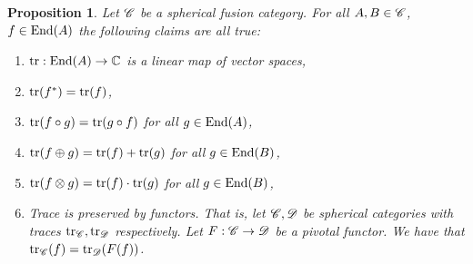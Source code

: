 \documentclass{article}
\newtheorem{proposition}{Proposition}[section]
\theoremstyle{definition}
\numberwithin{figure}{section}
\begin{document}
\begin{proposition}\label{trace} Let $\mathscr{C}$ be a spherical fusion category. For all $A,B\in \mathscr{C}$, $f\in \mathrm{End}(A)$ the following claims are all true:

\begin{enumerate}
\item $\mathrm{tr}: \mathrm{End}(A)\to \mathbb{C}$ is a linear map of vector spaces,
\item $\mathrm{tr}(f^{*})=\mathrm{tr}(f)$,
\item $\mathrm{tr}(f\circ g)=\mathrm{tr}(g\circ f)$ for all $g\in \mathrm{End}(A)$,
\item $\mathrm{tr}(f\oplus g)=\mathrm{tr}(f)+\mathrm{tr}(g)$ for all $g\in \mathrm{End}(B)$,
\item $\mathrm{tr}(f\otimes g)=\mathrm{tr}(f)\cdot \mathrm{tr}(g)$ for all $g\in \mathrm{End}(B)$,
\item Trace is preserved by functors. That is, let $\mathscr{C},\mathscr{D}$ be spherical categories with traces $\mathrm{tr}_{\mathscr{C}},\mathrm{tr}_{\mathscr{D}}$ respectively. Let $F:\mathscr{C}\to \mathscr{D}$ be a pivotal functor. We have that $\mathrm{tr}_{\mathscr{C}}(f)=\mathrm{tr}_{\mathscr{D}}(F(f))$.
\end{enumerate}

\end{proposition}
\end{document}
